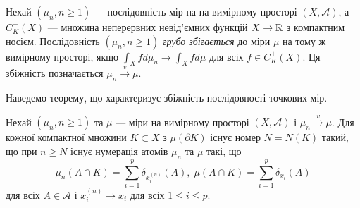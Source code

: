 \begin{definition}
    Нехай $\left(\mu_n, n \geq 1\right)$ --- послідовність мір на
    на вимірному просторі $\left(X, \mathcal{A}\right)$,
    а $C_K^+(X)$ --- множина неперервних невід'ємних функцій
    $X \to \mathbb{R}$ з компактним носієм.
    Послідовність $\left(\mu_n, n \geq 1\right)$
    \emph{грубо збігається} до міри $\mu$ на тому ж вимірному просторі,
    якщо $\int_X f d\mu_n \to \int_X f d\mu$ для всіх $f \in C_K^+(X)$.
    Ця збіжність позначається $\mu_n \overset{v}{\longrightarrow} \mu$.
\end{definition}
Наведемо теорему, що характеризує збіжність послідовності точкових мір.
\begin{theorem}
    Нехай $\left(\mu_n, n \geq 1\right)$ та $\mu$ --- міри
    на вимірному просторі $\left(X, \mathcal{A}\right)$ і
    $\mu_n \overset{v}{\longrightarrow} \mu$. Для кожної компактної множини
    $K \subset X$ з $\mu(\partial K)$ існує номер $N = N(K)$ такий,
    що при $n \geq N$ існує нумерація атомів $\mu_n$ та $\mu$ такі, що
    $$
        \mu_n(A \cap K) = \sum_{i=1}^p \delta_{x_i^{(n)}} (A), \;
        \mu(A \cap K) = \sum_{i=1}^p \delta_{x_i} (A)
    $$
    для всіх $A \in \mathcal{A}$ і $x_i^{(n)} \to x_i$ для всіх $1 \leq i \leq p$.
\end{theorem}